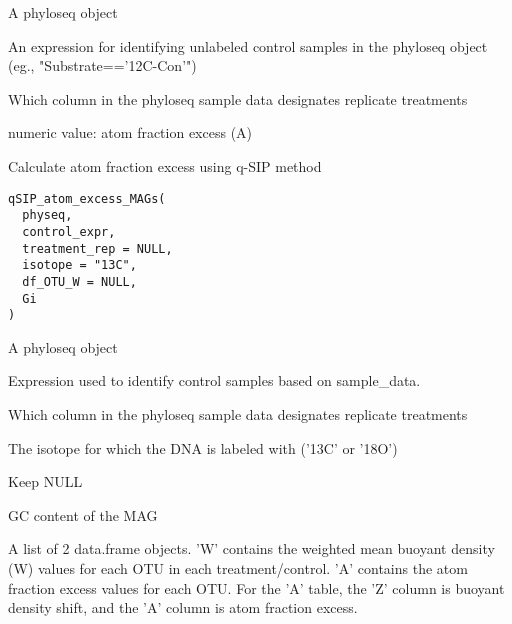 \documentclass[a4paper]{book}
\begin{document}
%
\begin{Arguments}
\begin{ldescription}
\item[\code{physeq}] A phyloseq object

\item[\code{control\_expr}] An expression for identifying unlabeled control
samples in the phyloseq object (eg., "Substrate=='12C-Con'")

\item[\code{treatment\_rep}] Which column in the phyloseq sample data designates
replicate treatments
\end{ldescription}
\end{Arguments}
%
\begin{Value}
numeric value: atom fraction excess (A)
\end{Value}
%
\begin{Description}\relax
Calculate atom fraction excess using q-SIP method
\end{Description}
%
\begin{Usage}
\begin{verbatim}
qSIP_atom_excess_MAGs(
  physeq,
  control_expr,
  treatment_rep = NULL,
  isotope = "13C",
  df_OTU_W = NULL,
  Gi
)
\end{verbatim}
\end{Usage}
%
\begin{Arguments}
\begin{ldescription}
\item[\code{physeq}] A phyloseq object

\item[\code{control\_expr}] Expression used to identify control samples based on sample\_data.

\item[\code{treatment\_rep}] Which column in the phyloseq sample data designates
replicate treatments

\item[\code{isotope}] The isotope for which the DNA is labeled with ('13C' or '18O')

\item[\code{df\_OTU\_W}] Keep NULL

\item[\code{Gi}] GC content of the MAG
\end{ldescription}
\end{Arguments}
%
\begin{Value}
A list of 2 data.frame objects. 'W' contains the weighted mean buoyant density (W) values for each OTU in each treatment/control. 'A' contains the atom fraction excess values for each OTU. For the 'A' table, the 'Z' column is buoyant density shift, and the 'A' column is atom fraction excess.
\end{Value}
\end{document}
